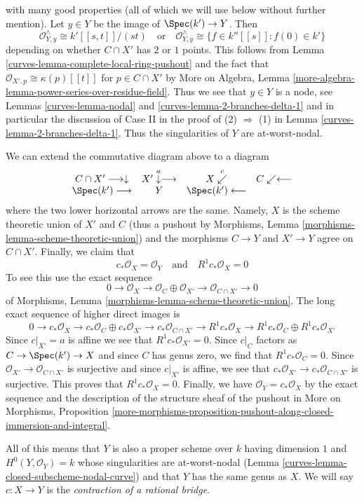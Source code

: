 \begin{example}
$$$$
with many good properties (all of which we will use below without
further mention). Let $y \in Y$ be the image of $\Spec(k') \to Y$.
Then
$$
\mathcal{O}_{Y, y}^\wedge \cong k'[[s, t]]/(st)
\quad\text{or}\quad
\mathcal{O}_{Y, y}^\wedge \cong
\{f \in k''[[s]] : f(0) \in k'\}
$$
depending on whether $C \cap X'$ has $2$ or $1$ points.
This follows from Lemma \ref{curves-lemma-complete-local-ring-pushout}
and the fact that $\mathcal{O}_{X', p} \cong \kappa(p)[[t]]$
for $p \in C \cap X'$ by More on Algebra, Lemma
\ref{more-algebra-lemma-power-series-over-residue-field}.
Thus we see that $y \in Y$ is a node, see Lemmas \ref{curves-lemma-nodal}
and \ref{curves-lemma-2-branches-delta-1} and in particular the discussion
of Case II in the proof of (2) $\Rightarrow$ (1) in
Lemma \ref{curves-lemma-2-branches-delta-1}.
Thus the singularities of $Y$ are at-worst-nodal.

\medskip\noindent
We can extend the commutative diagram above to a diagram
$$
\begin{array}{cccc}C \cap X' \longrightarrow\downarrow & X' \overset{a}{\downarrow}\longrightarrow & X \overset{c}{\swarrow} & C \swarrow\longleftarrow \\ \Spec(k') \longrightarrow & Y & \Spec(k') \longleftarrow & \end{array}
$$
where the two lower horizontal arrows are the same. Namely, $X$ is the
scheme theoretic union of $X'$ and $C$ (thus a pushout by
Morphisms, Lemma \ref{morphisms-lemma-scheme-theoretic-union})
and the morphisms $C \to Y$ and $X' \to Y$ agree on $C \cap X'$.
Finally, we claim that
$$
c_*\mathcal{O}_X = \mathcal{O}_Y
\quad\text{and}\quad
R^1c_*\mathcal{O}_X = 0
$$
To see this use the exact sequence
$$
0 \to \mathcal{O}_X \to
\mathcal{O}_C \oplus \mathcal{O}_{X'} \to
\mathcal{O}_{C \cap X'} \to 0
$$
of Morphisms, Lemma \ref{morphisms-lemma-scheme-theoretic-union}.
The long exact sequence of higher direct images is
$$
0 \to c_*\mathcal{O}_X \to c_*\mathcal{O}_C \oplus c_*\mathcal{O}_{X'} \to
c_*\mathcal{O}_{C \cap X'} \to
R^1c_*\mathcal{O}_X \to
R^1c_*\mathcal{O}_C \oplus R^1c_*\mathcal{O}_{X'}
$$
Since $c|_{X'} = a$ is affine we see that
$R^1c_*\mathcal{O}_{X'} = 0$.
Since $c|_C$ factors as $C \to \Spec(k') \to X$ and since
$C$ has genus zero, we find that $R^1c_*\mathcal{O}_C = 0$.
Since $\mathcal{O}_{X'} \to \mathcal{O}_{C \cap X'}$ is
surjective and since $c|_{X'}$ is affine, we see that
$c_*\mathcal{O}_{X'} \to c_*\mathcal{O}_{C \cap X'}$
is surjective. This proves that $R^1c_*\mathcal{O}_X = 0$.
Finally, we have
$\mathcal{O}_Y = c_*\mathcal{O}_X$ by
the exact sequence and
the description of the structure sheaf of the pushout
in More on Morphisms, Proposition
\ref{more-morphisms-proposition-pushout-along-closed-immersion-and-integral}.

\medskip\noindent
All of this means that $Y$ is also a proper scheme over $k$
having dimension $1$ and $H^0(Y, \mathcal{O}_Y) = k$
whose singularities are at-worst-nodal
(Lemma \ref{curves-lemma-closed-subscheme-nodal-curve})
and that $Y$ has the same genus as $X$.
We will say $c : X \to Y$ is the
{\it contraction of a rational bridge}.
\end{example}

